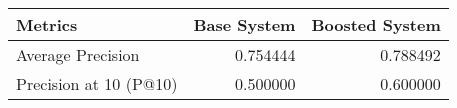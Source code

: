 \begin{tabular}{lrr}
\toprule
Metrics & Base System & Boosted System \\
\midrule
Average Precision & 0.754444 & 0.788492 \\
Precision at 10 (P@10) & 0.500000 & 0.600000 \\
\bottomrule
\end{tabular}

